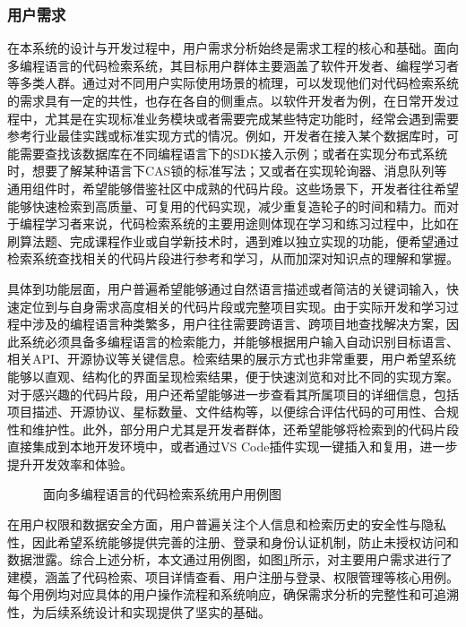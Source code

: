 \documentclass[UTF8,a4paper,12pt]{ctexart}
\numberwithin{equation}{section}
\begin{document}
\subsubsection{用户需求}
在本系统的设计与开发过程中，用户需求分析始终是需求工程的核心和基础。面向多编程语言的代码检索系统，其目标用户群体主要涵盖了软件开发者、编程学习者等多类人群。通过对不同用户实际使用场景的梳理，可以发现他们对代码检索系统的需求具有一定的共性，也存在各自的侧重点。以软件开发者为例，在日常开发过程中，尤其是在实现标准业务模块或者需要完成某些特定功能时，经常会遇到需要参考行业最佳实践或标准实现方式的情况。例如，开发者在接入某个数据库时，可能需要查找该数据库在不同编程语言下的SDK接入示例；或者在实现分布式系统时，想要了解某种语言下CAS锁的标准写法；又或者在实现轮询器、消息队列等通用组件时，希望能够借鉴社区中成熟的代码片段。这些场景下，开发者往往希望能够快速检索到高质量、可复用的代码实现，减少重复造轮子的时间和精力。而对于编程学习者来说，代码检索系统的主要用途则体现在学习和练习过程中，比如在刷算法题、完成课程作业或自学新技术时，遇到难以独立实现的功能，便希望通过检索系统查找相关的代码片段进行参考和学习，从而加深对知识点的理解和掌握。\par
具体到功能层面，用户普遍希望能够通过自然语言描述或者简洁的关键词输入，快速定位到与自身需求高度相关的代码片段或完整项目实现。由于实际开发和学习过程中涉及的编程语言种类繁多，用户往往需要跨语言、跨项目地查找解决方案，因此系统必须具备多编程语言的检索能力，并能够根据用户输入自动识别目标语言、相关API、开源协议等关键信息。检索结果的展示方式也非常重要，用户希望系统能够以直观、结构化的界面呈现检索结果，便于快速浏览和对比不同的实现方案。对于感兴趣的代码片段，用户还希望能够进一步查看其所属项目的详细信息，包括项目描述、开源协议、星标数量、文件结构等，以便综合评估代码的可用性、合规性和维护性。此外，部分用户尤其是开发者群体，还希望能够将检索到的代码片段直接集成到本地开发环境中，或者通过VS Code插件实现一键插入和复用，进一步提升开发效率和体验。\par
\begin{figure}[H]
	\caption{面向多编程语言的代码检索系统用户用例图}
	\label{usecase}
\end{figure}
在用户权限和数据安全方面，用户普遍关注个人信息和检索历史的安全性与隐私性，因此希望系统能够提供完善的注册、登录和身份认证机制，防止未授权访问和数据泄露。综合上述分析，本文通过用例图，如图\ref{usecase}所示，对主要用户需求进行了建模，涵盖了代码检索、项目详情查看、用户注册与登录、权限管理等核心用例。每个用例均对应具体的用户操作流程和系统响应，确保需求分析的完整性和可追溯性，为后续系统设计和实现提供了坚实的基础。\par
\end{document}
